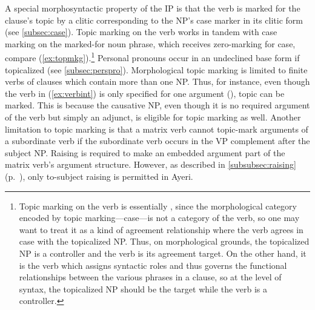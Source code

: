 A special morphosyntactic property of the IP is that the verb is marked for the
clause's topic by a clitic corresponding to the NP's case marker in its clitic
form (see \autoref{subsec:case}). Topic marking on the verb works in tandem
with case marking on the marked-for noun phrase, which receives zero-marking
for case, compare (\ref{ex:topmkg}).\footnote{Topic marking on the verb is
essentially , since the
morphological category encoded by topic marking---case---is not a category of
the verb, so one may want to treat it as a kind of agreement relationship where
the verb agrees in case with the topicalized NP. Thus, on morphological
grounds, the topicalized NP is a controller and the verb is its agreement
target. On the other hand, it is the verb which assigns syntactic roles and
thus governs the functional relationships between the various phrases in a
clause, so at the level of syntax, the topicalized NP should be the target
while the verb is a controller.} Personal pronouns occur in an undeclined base
form if topicalized (see \autoref{subsec:perspro}). Morphological topic marking
is limited to finite verbs of clauses which contain more than one NP. Thus, for
instance, even though the verb in (\ref{ex:verbint}) is only specified for one
argument (\Aarg{}), topic can be marked. This is because the causative NP, even
though it is no required argument of the verb but simply an adjunct, is
eligible for topic marking as well. Another limitation to topic marking is that
a matrix verb cannot topic-mark arguments of a subordinate verb if the
subordinate verb occurs in the VP complement after the subject NP. Raising is
required to make an embedded argument part of the matrix verb's argument
structure. However, as described in \autoref{subsubsec:raising}
(p.~\pageref{subsubsec:raising}), only to-subject raising is permitted in
Ayeri.

